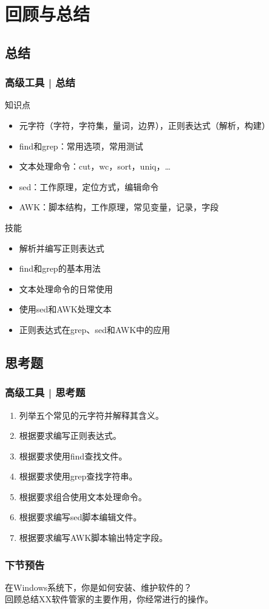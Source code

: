 \section{回顾与总结}
\subsection{总结}
\begin{frame}
  \frametitle{高级工具 | 总结}
  \begin{block}{知识点}
    \begin{itemize}
      \item 元字符（字符，字符集，量词，边界），正则表达式（解析，构建）
      \item find和grep：常用选项，常用测试
      \item 文本处理命令：cut，wc，sort，uniq，\ldots
      \item sed：工作原理，定位方式，编辑命令
      \item AWK：脚本结构，工作原理，常见变量，记录，字段
    \end{itemize}
  \end{block}
  \begin{block}{技能}
    \begin{itemize}
      \item 解析并编写正则表达式
      \item find和grep的基本用法
      \item 文本处理命令的日常使用
      \item 使用sed和AWK处理文本
      \item 正则表达式在grep、sed和AWK中的应用
    \end{itemize}
  \end{block}
\end{frame}

\subsection{思考题}
\begin{frame}
  \frametitle{高级工具 | 思考题}
  \begin{enumerate}
    \item 列举五个常见的元字符并解释其含义。
    \item 根据要求编写正则表达式。
    \item 根据要求使用find查找文件。
    \item 根据要求使用grep查找字符串。
    \item 根据要求组合使用文本处理命令。
    \item 根据要求编写sed脚本编辑文件。
    \item 根据要求编写AWK脚本输出特定字段。
  \end{enumerate}
\end{frame}

\begin{frame}
  \frametitle{下节预告}
   在Windows系统下，你是如何安装、维护软件的？\\
   回顾总结XX软件管家的主要作用，你经常进行的操作。
\end{frame}





